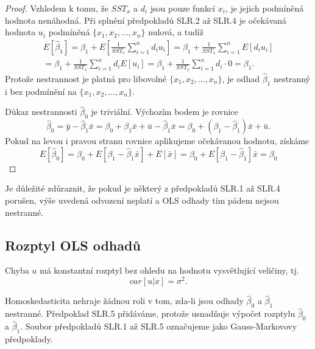 \begin{proof}
Vzhledem k tomu, že $SST_x$ a $d_i$ jsou pouze funkcí $x_i$, je jejich podmíněná hodnota nenáhodná. Při splnění předpokladů SLR.2 až SLR.4 je očekávaná hodnota $u_i$ 
podmíněná $\{x_1, x_2, ..., x_n\}$ nulová, a tudíž
\begin{multline}
E[\hat{\beta}_1] = \beta_1 + E\left[\frac{1}{SST_x} \sum_{i = 1}^n d_i u_i \right] = \beta_1 + \frac{1}{SST_x}\sum_{i = 
1}^n E[d_i u_i]\\
= \beta_1 + \frac{1}{SST_x}\sum_{i = 1}^n d_i E[u_i] = \beta_1 + \frac{1}{SST_x}\sum_{i = 1}^n d_i \cdot 0 = \beta_1.
\end{multline}
Protože nestrannost je platná pro libovolné $\{x_1, x_2, ..., x_n\}$, je odhad $\hat{\beta}_1$ nestranný i bez podmínění na $\{x_1, x_2, ..., x_n\}$.

Důkaz nestrannosti $\hat{\beta}_0$ je triviální. Výchozím bodem je rovnice
\begin{equation}
\hat{\beta}_0 = \bar{y} - \hat{\beta}_1\bar{x} = \beta_0 + \beta_1 \bar{x} + \bar{u} - \hat{\beta}_1 \bar{x} = \beta_0 
+ (\beta_1 - \hat{\beta}_1)\bar{x} + \bar{u}.
\end{equation}
Pokud na levou i pravou stranu rovnice aplikujeme očekávanou hodnotu, získáme
\begin{equation}
E[\hat{\beta}_0] = \beta_0 + E[\beta_1 - \hat{\beta}_1\bar{x}] + E[\bar{x}] = \beta_0 + E[\beta_1 - 
\hat{\beta}_1]\bar{x} = \beta_0
\end{equation}

\raggedleft{$\clubsuit$}
\end{proof}

Je důležité zdůraznit, že pokud je některý z předpokladů SLR.1 až SLR.4 porušen, výše uvedená odvození 
neplatí a OLS odhady tím pádem nejsou nestranné.

\subsection{Rozptyl OLS odhadů}

\begin{assumption}
Chyba $u$ má konstantní rozptyl bez ohledu na hodnotu vysvětlující veličiny, tj.
\begin{equation}
var[u|x] = \sigma^2.
\end{equation}

\raggedleft{$\clubsuit$}
\end{assumption}

Homoskedasticita nehraje žádnou roli v tom, zda-li jsou odhady $\hat{\beta}_0$ a $\hat{\beta}_1$ nestranné. 
Předpoklad SLR.5 přidáváme, protože usnadňuje výpočet rozptylu $\hat{\beta}_0$ a $\hat{\beta}_1$. Soubor 
předpokladů SLR.1 až SLR.5 označujeme jako Gauss-Markovovy předpoklady.


